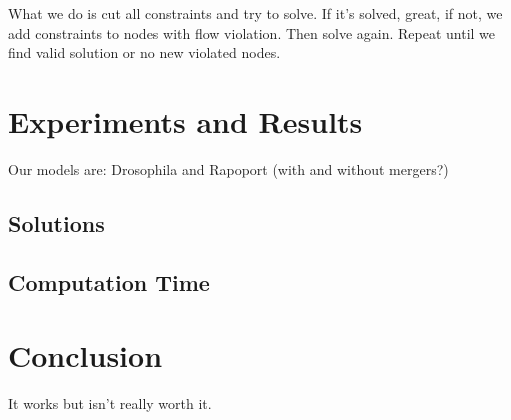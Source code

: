 \documentclass[10pt,twocolumn,letterpaper]{article}
\begin{document}
What we do is cut all constraints and try to solve. If it's solved, great, if not, we add constraints to nodes with flow violation. Then solve again. Repeat until we find valid solution or no new violated nodes.

\section{Experiments and Results}

Our models are: Drosophila and Rapoport (with and without mergers?)

\subsection{Solutions}

\subsection{Computation Time}


\section{Conclusion}

It works but isn't really worth it.


{\small


}
\end{document}
